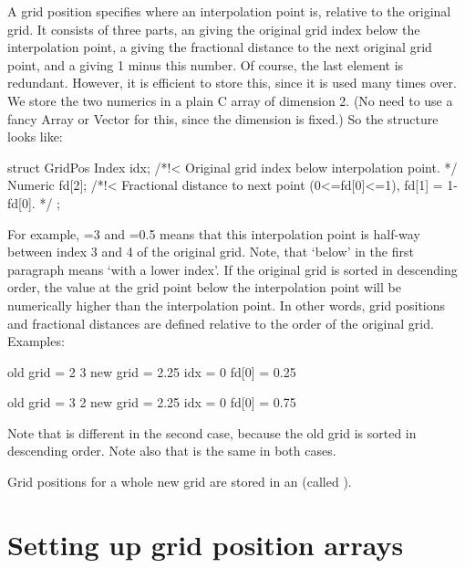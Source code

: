 A grid position specifies where an interpolation point is, relative
to the original grid. It consists of three parts, an  giving the
original grid index below the interpolation point, a 
giving the fractional distance to the next original grid point, and a
 giving 1 minus this number. Of course, the last element is
redundant. However, it is efficient to store this, since it is used
many times over. We store the two numerics in a plain C array of
dimension 2. (No need to use a fancy Array or Vector for this, since
the dimension is fixed.) So the structure  looks like:

\begin{code}
struct GridPos  {
   Index   idx;      /*!< Original grid index below
                          interpolation point. */
   Numeric fd[2];    /*!< Fractional distance to next point
                          (0<=fd[0]<=1), fd[1] = 1-fd[0]. */ 
};
\end{code}

For example, =3 and =0.5 means that this interpolation point is
half-way between index 3 and 4 of the original grid.  Note, that
`below' in the first paragraph means `with a lower index'. If the
original grid is sorted in descending order, the value at the grid
point below the interpolation point will be numerically higher than
the interpolation point.  In other words, grid positions and
fractional distances are defined relative to the order of the original
grid. Examples:

\begin{code}
old grid = 2 3
new grid = 2.25
idx      = 0
fd[0]    = 0.25

old grid = 3 2
new grid = 2.25
idx      = 0
fd[0]    = 0.75
\end{code}

Note that  is different in the second case, because the old grid
is sorted in descending order. Note also that  is the same in
both cases.

Grid positions for a whole new grid are stored in an 
(called ). 

\section{Setting up grid position arrays}

